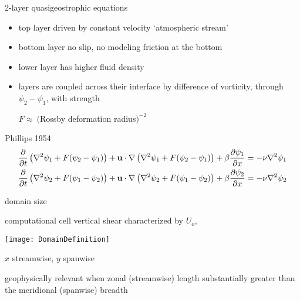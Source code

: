 \begin{frame}{2-layer quasigeostrophic equations}

			\begin{exampleblock}{}
\begin{itemize}
  \item
top layer driven by constant velocity `atmospheric stream'
  \item
bottom layer no slip, no
 modeling
friction at the bottom
  \item
lower layer has higher fluid density
  \item
layers are coupled across their interface by difference of vorticity,
through $\psi_2-\psi_1$, with strength


$F \approx~(${\scriptsize Rossby deformation radius}$)^{-2}$
\end{itemize}
			\end{exampleblock}


\begin{block}{Phillips 1954}
    {\scriptsize
\begin{eqnarray}
\frac{\partial}{\partial t} \left(\nabla^2 \psi_1
+ F(\psi_2-\psi_1)\right)+\textbf{u} \cdot \nabla \left(\nabla^2 \psi_1 + F(\psi_2-\psi_1)\right)+\beta \frac{\partial \psi_1}{\partial x}
  = -\nu \nabla^2 \psi_1 \nonumber \\
\frac{\partial}{\partial t} \left(\nabla^2 \psi_2
+ F(\psi_1-\psi_2)\right)+\textbf{u} \cdot \nabla \left(\nabla^2 \psi_2 + F(\psi_1-\psi_2)\right)+\beta \frac{\partial \psi_2}{\partial x}
=-\nu \nabla^2 \psi_2
\nonumber
\end{eqnarray}
    }
\end{block}
\end{frame}

\begin{frame}{domain size}

\begin{block}{computational cell}
vertical  shear characterized by $U_o$,
\begin{center}
  \texttt{[image: DomainDefinition]}\\
\end{center}
$x$ streamwise, $y$ spanwise
\end{block}

\begin{block}{geophysically relevant}
when zonal (streamwise) length
substantially greater than the meridional (spanwise) breadth
\end{block}
\end{frame}

